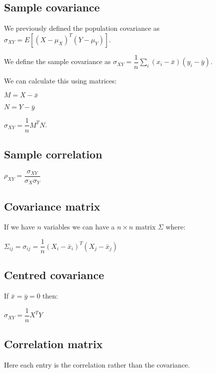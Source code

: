 
\subsection{Sample covariance}

We previously defined the population covariance as \(\sigma_{XY}=E[(X-\mu_X)^T(Y-\mu_Y)]\).

We define the sample covariance as \(\sigma_{XY}=\dfrac{1}{n}\sum_i(x_i-\bar x)(y_i-\bar y)\).

We can calculate this using matrices:

\(M=X-\bar x\)

\(N=Y-\bar y\)

\(\sigma_{XY}=\dfrac{1}{n}M^TN\).

\subsection{Sample correlation}

\(\rho_{XY}=\dfrac{\sigma_{XY}}{\sigma_X \sigma_Y}\)

\subsection{Covariance matrix}

If we have \(n\) variables we can have a \(n\times n \) matrix \(\Sigma \) where:

\(\Sigma_{ij} = \sigma_{ij}=\dfrac{1}{n}(X_i-\bar x_i)^T(X_j-\bar x_j)\)

\subsection{Centred covariance}

If \(\bar x = \bar y = 0\) then:

\(\sigma_{XY}=\dfrac{1}{n}X^TY\)

\subsection{Correlation matrix}

Here each entry is the correlation rather than the covariance.

